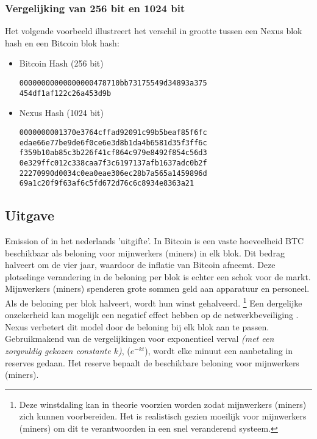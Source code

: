\documentclass[11pt]{article}
\begin{document}
\subsubsection{Vergelijking van 256 bit en 1024 bit}

Het volgende voorbeeld illustreert het verschil in grootte tussen een Nexus blok hash en een Bitcoin blok hash:

\begin{itemize}
\item Bitcoin Hash (256 bit)
\begin{lstlisting}
00000000000000000478710bb73175549d34893a375
454df1af122c26a453d9b
\end{lstlisting}

\item Nexus Hash (1024 bit)

\begin{lstlisting}
0000000001370e3764cffad92091c99b5beaf85f6fc
edae66e77be9de6f0ce6e3d8b1da4b6581d35f3ff6c
f359b10ab85c3b226f41cf864c979e8492f854c56d3
0e329ffc012c338caa7f3c6197137afb1637adc0b2f
22270990d0034c0ea0eae306ec28b7a565a1459896d
69a1c20f9f63af6c5fd672d76c6c8934e8363a21
\end{lstlisting}
\end{itemize}


\pagebreak
\subsection{Uitgave}

Emission of in het nederlands 'uitgifte'. In Bitcoin is een vaste hoeveelheid BTC beschikbaar als beloning voor mijnwerkers (miners) in elk blok. Dit bedrag halveert om de vier jaar, waardoor de inflatie van Bitcoin afneemt. Deze plotselinge verandering in de beloning per blok is echter een schok voor de markt. Mijnwerkers (miners) spenderen grote sommen geld aan apparatuur en personeel. Als de beloning per blok halveert, wordt hun winst gehalveerd.
\footnote{Deze winstdaling kan in theorie voorzien worden zodat mijnwerkers (miners) zich kunnen voorbereiden. Het is realistisch gezien moeilijk voor mijnwerkers (miners) om dit te verantwoorden in een snel veranderend systeem.}
Een dergelijke onzekerheid kan mogelijk een negatief effect hebben op de netwerkbeveiliging \cite{cdhalving}.
\noindent Nexus verbetert dit model door de beloning bij elk blok aan te passen. Gebruikmakend van de vergelijkingen voor exponentieel verval \textit{(met een zorgvuldig gekozen constante $k$)}, ($e^{-kt}$), 
wordt elke minuut een aanbetaling in reserves gedaan. Het reserve bepaalt de beschikbare beloning voor mijnwerkers (miners).\\ 
\end{document}
